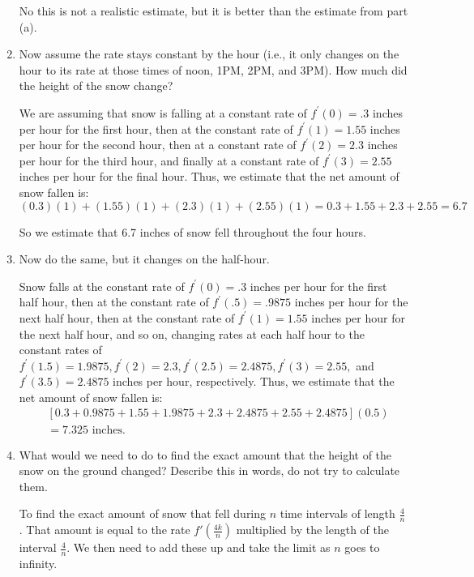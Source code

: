 \documentclass[nooutcomes,handout]{ximera}
\begin{document}
\begin{problem}
\begin{enumerate}
\begin{freeResponse}
      No this is not a realistic estimate, but it is better than the estimate from part (a).  
    \end{freeResponse}
 
  \item  Now assume the rate stays constant by the hour (i.e., it only changes on the hour to its rate at those times of noon, 1PM, 2PM, and 3PM).  How much did the height of the snow change?
    \begin{freeResponse}
      We are assuming that snow is falling at a constant rate of $f^\prime (0)=.3$ inches per hour for the first hour, then at the constant rate of $f^\prime (1)=1.55$ inches per hour for the second hour, then at a constant rate of $f^\prime (2)=2.3$ inches per hour for the third hour, and finally at a constant rate of $f^\prime (3)=2.55$ inches per hour for the final hour.  Thus, we estimate that the net amount of snow fallen is:
      $$ (0.3)(1) + (1.55)(1) + (2.3)(1) + (2.55)(1) = 0.3 + 1.55 + 2.3 + 2.55 = 6.7 $$
      
      So we estimate that 6.7 inches of snow fell throughout the four hours.
    \end{freeResponse}
    
  \item  Now do the same, but it changes on the half-hour.
    \begin{freeResponse}
      Snow falls at the constant rate of $f^\prime (0)=.3$ inches per hour for the first half hour, then at the constant rate of $f^\prime (.5)=.9875$ inches per hour for the next half hour, then at the constant rate of $f^\prime (1)=1.55$ inches per hour for the next half hour, and so on, changing rates at each half hour to the constant rates of $f^\prime (1.5)=1.9875, f^\prime (2)=2.3, f^\prime (2.5)=2.4875, f^\prime (3)=2.55, $ and $f^\prime (3.5)=2.4875$ inches per hour, respectively.  Thus, we estimate that the net amount of snow fallen is:
      \begin{align*}
        & [0.3 + 0.9875 + 1.55 + 1.9875 + 2.3 + 2.4875 + 2.55 + 2.4875](0.5) \\
        &= 7.325 \text{ inches}.
      \end{align*}
    \end{freeResponse}
    
    
    
  \item  What would we need to do to find the exact amount that the height of the snow on the ground changed? Describe this in words, do not try to calculate them.
    \begin{freeResponse}
      To find the exact amount of snow that fell during $n$ time intervals of length $\frac{4}{n}$.  That amount is equal to the rate $f'\left(\frac{4k}{n}\right)$ multiplied by the length of the interval $\frac{4}{n}$.  We then need to add these up and take the limit as $n$ goes to infinity.
      

\end{freeResponse}
\end{enumerate}
\end{problem}
\end{document}
